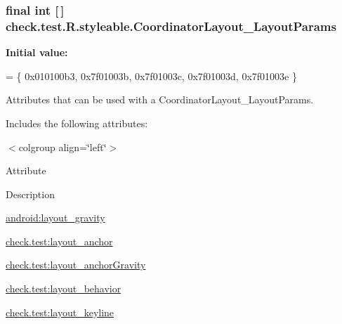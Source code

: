 \subsubsection[{Coordinator\+Layout\+\_\+\+Layout\+Params}]{\setlength{\rightskip}{0pt plus 5cm}final int \mbox{[}$\,$\mbox{]} check.\+test.\+R.\+styleable.\+Coordinator\+Layout\+\_\+\+Layout\+Params\hspace{0.3cm}{\ttfamily [static]}}\label{classcheck_1_1test_1_1_r_1_1styleable_a9873c4709aad91a176af799873edc422}
{\bfseries Initial value\+:}
\begin{DoxyCode}
= \{
            0x010100b3, 0x7f01003b, 0x7f01003c, 0x7f01003d,
            0x7f01003e
        \}
\end{DoxyCode}
Attributes that can be used with a Coordinator\+Layout\+\_\+\+Layout\+Params. 

Includes the following attributes\+:

\begin{TabularC}{0}
\hline
\end{TabularC}
$<$colgroup align=\char`\"{}left\char`\"{}$>$ 

Attribute

Description 

{\ttfamily \hyperlink{classcheck_1_1test_1_1_r_1_1styleable_a0b7c3eda13b614a196a08848298a893f}{android\+:layout\+\_\+gravity}}

{\ttfamily \hyperlink{classcheck_1_1test_1_1_r_1_1styleable_a8e01daeccfb5aa2fea37a64ec5b7fb3f}{check.\+test\+:layout\+\_\+anchor}}

{\ttfamily \hyperlink{classcheck_1_1test_1_1_r_1_1styleable_a5b244cd9e2a37484e7cf43272ca1e0f7}{check.\+test\+:layout\+\_\+anchor\+Gravity}}

{\ttfamily \hyperlink{classcheck_1_1test_1_1_r_1_1styleable_ae9db473c28ded0bb6dcf42e3c26445a1}{check.\+test\+:layout\+\_\+behavior}}

{\ttfamily \hyperlink{classcheck_1_1test_1_1_r_1_1styleable_a4dd7ccd864a6f3ecf1b6734fb54a58ff}{check.\+test\+:layout\+\_\+keyline}}

